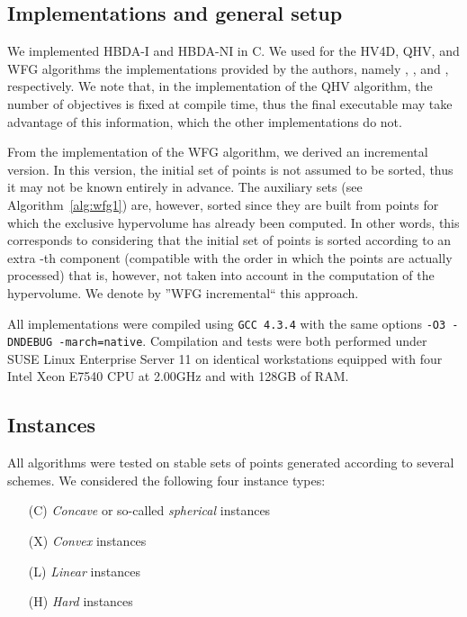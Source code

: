 \documentclass[a4paper,11pt]{article}
\begin{document}
\subsection{Implementations and general setup}\label{sub:setup}

We implemented HBDA-I and HBDA-NI
in C.
We used for the HV4D, QHV, and WFG algorithms the implementations provided by the authors,
namely \citet[version 2.0 RC 2]{HV4D},  
\citet[retrieved on April, 2015]{QHV}, 
and \citet[version 1.10]{WFG}, respectively.
We note that, in the implementation of the QHV algorithm, 
the number of objectives is fixed at compile time,
thus the final executable may take advantage of this information,
which the other implementations do not.

From the implementation of the WFG algorithm, we derived an incremental version.
In this version, the initial set of points is not assumed to be sorted, 
thus it may not be known entirely in advance.
The auxiliary sets  (see Algorithm~\ref{alg:wfg1}) are, however, sorted 
since they are built from points for which the exclusive hypervolume has already been computed.
In other words, this corresponds to considering 
that the initial set of points is sorted according to an extra -th 
component (compatible with the order in which the points are actually processed)
that is, however, not taken into account in the computation of the hypervolume.
We denote by ''WFG incremental`` this approach.

All implementations were compiled using \texttt{GCC 4.3.4} with the same options 
\texttt{-O3 -DNDEBUG -march=native}. Compilation and tests were both performed 
under SUSE Linux Enterprise Server 11 
on identical workstations equipped with four Intel Xeon E7540 CPU at 2.00GHz and with 128GB of RAM.




\subsection{Instances}\label{sub:instances}

All algorithms were tested on stable sets of points generated according to several schemes.
We considered the following four instance types:
\begin{itemize}
  \item[(C)] \emph{Concave} or so-called \emph{spherical} \citep{DebThiLauZit02} instances
  \item[(X)] \emph{Convex} instances
  \item[(L)] \emph{Linear} instances  
  \item[(H)] \emph{Hard} instances
\end{itemize}
\end{document}

